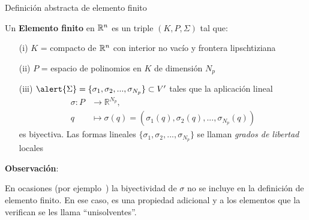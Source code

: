 \documentclass[10pt,leqno]{beamer}
\newcommand{\Np}{{N_p}}
\begin{document}
\begin{frame}{Definición abstracta de elemento finito}
  \begin{definition}
    Un \textbf{\alert{Elemento finito}} en ${\mathbb R}^n$ es un triple
    $(K,P,\Sigma)$ tal que:
    \smallskip
    \begin{itemize}
    \item[(i)] \alert{$K$} = compacto de ${\mathbb R}^n$ con interior no vac\'io y
      frontera lipschtiziana
    \item[(ii)] \alert{$P$} = espacio de polinomios en $K$ de dimensi\'on $\Np$
    \item[(iii)] $\alert{\Sigma}=\{\sigma_1,\sigma_2,...,\sigma_{\Np}\} \subset V'$
      tales que la aplicaci\'on lineal
      \begin{align*}
        \sigma: P& \longrightarrow \mathbb{R}^{\Np},\\
        q& \longmapsto \sigma(q)=(\sigma_1(q), \sigma_2(q),..., \sigma_{\Np}(q))
      \end{align*}
      es biyectiva. Las formas lineales
      $\{\sigma_1,\sigma_2,...,\sigma_{\Np}\}$ se llaman
      \textit{grados de libertad} locales
    \end{itemize}
  \end{definition}

  \par\bigskip
  \scriptsize \textbf{Observación}:
  \par\medskip
  En ocasiones (por
  ejemplo~\cite{Ciarlet:78}) la biyectividad de $\sigma$ no se incluye
  en la definición de elemento finito. En ese caso, es una propiedad
  adicional y a los elementos que la verifican se les llama
  ``unisolventes''.
\end{frame}
\end{document}
